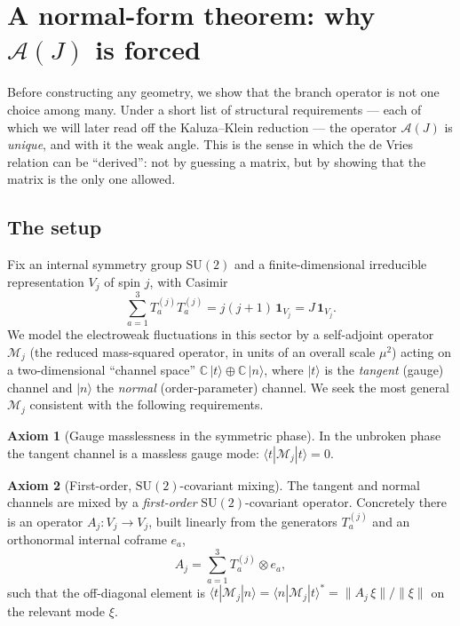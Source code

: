 \documentclass[11pt]{article}
\theoremstyle{plain}
\theoremstyle{definition}
\newtheorem{axiom}{Axiom}
\newcommand{\cA}{\mathcal{A}}
\newcommand{\cM}{\mathcal{M}}
\newcommand{\C}{\mathbb{C}}
\newcommand{\SU}{\mathrm{SU}}
\begin{document}
\section{A normal-form theorem: why \texorpdfstring{$\cA(J)$}{A(J)} is forced}
\label{sec:normalform}

Before constructing any geometry, we show that the branch operator is not
one choice among many. Under a short list of structural requirements --- each
of which we will later read off the Kaluza--Klein reduction --- the
operator $\cA(J)$ is \emph{unique}, and with it the weak angle. This is the
sense in which the de Vries relation can be ``derived'': not by guessing a
matrix, but by showing that the matrix is the only one allowed.

\subsection{The setup}

Fix an internal symmetry group $\SU(2)$ and a finite-dimensional
irreducible representation $V_j$ of spin $j$, with Casimir
\begin{equation}
\sum_{a=1}^{3}T_a^{(j)}T_a^{(j)}=j(j+1)\,\bm1_{V_j}=J\,\bm1_{V_j}.
\label{eq:casimir}
\end{equation}
We model the electroweak fluctuations in this sector by a self-adjoint
operator $\cM_j$ (the reduced mass-squared operator, in units of an overall
scale $\mu^2$) acting on a two-dimensional ``channel space''
$\C\,|t\rangle\oplus\C\,|n\rangle$, where $|t\rangle$ is the
\emph{tangent} (gauge) channel and $|n\rangle$ the \emph{normal}
(order-parameter) channel. We seek the most general $\cM_j$ consistent with
the following requirements.

\begin{axiom}[Gauge masslessness in the symmetric phase]
\label{ax:1}
In the unbroken phase the tangent channel is a massless gauge mode:
$\langle t|\cM_j|t\rangle=0$.
\end{axiom}

\begin{axiom}[First-order, $\SU(2)$-covariant mixing]
\label{ax:2}
The tangent and normal channels are mixed by a \emph{first-order}
$\SU(2)$-covariant operator. Concretely there is an operator
$A_j:V_j\to V_j$, built linearly from the generators $T_a^{(j)}$ and an
orthonormal internal coframe $e_a$,
\begin{equation}
A_j=\sum_{a=1}^{3}T_a^{(j)}\otimes e_a,
\label{eq:Adef}
\end{equation}
such that the off-diagonal element is $\langle t|\cM_j|n\rangle=
\langle n|\cM_j|t\rangle^{*}=\|A_j\,\xi\|/\|\xi\|$ on the relevant mode
$\xi$.
\end{axiom}
\end{document}

